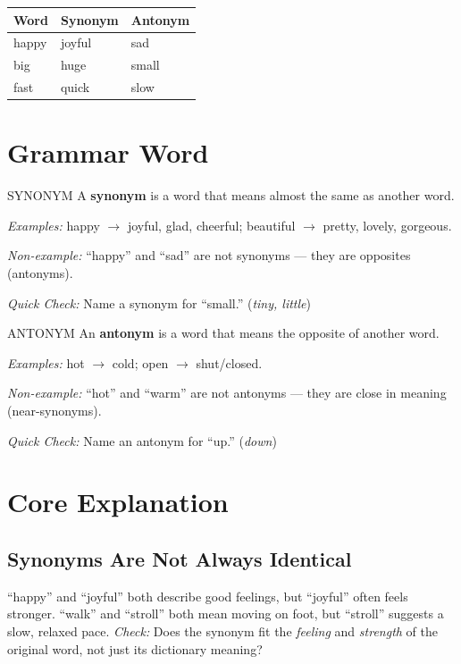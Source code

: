 \begin{table}[h!]
\centering
\begin{tabular}{|l|l|l|}
\hline
\textbf{Word} & \textbf{Synonym} & \textbf{Antonym} \\
\hline
happy & joyful & sad \\
big & huge & small \\
fast & quick & slow \\
\hline
\end{tabular}
\end{table}

\section{Grammar Word}
\begin{grammarword}{SYNONYM}
A \textbf{synonym} is a word that means almost the same as another word.

\textit{Examples:} happy $\rightarrow$ joyful, glad, cheerful; beautiful $\rightarrow$ pretty, lovely, gorgeous.

\textit{Non-example:} ``happy'' and ``sad'' are not synonyms --- they are opposites (antonyms).

\textit{Quick Check:} Name a synonym for ``small.'' (\textit{tiny, little})
\end{grammarword}

\begin{grammarword}{ANTONYM}
An \textbf{antonym} is a word that means the opposite of another word.

\textit{Examples:} hot $\rightarrow$ cold; open $\rightarrow$ shut/closed.

\textit{Non-example:} ``hot'' and ``warm'' are not antonyms --- they are close in meaning (near-synonyms).

\textit{Quick Check:} Name an antonym for ``up.'' (\textit{down})
\end{grammarword}

\section{Core Explanation}

\subsection*{Synonyms Are Not Always Identical}
``happy'' and ``joyful'' both describe good feelings, but ``joyful'' often feels stronger. ``walk'' and ``stroll'' both mean moving on foot, but ``stroll'' suggests a slow, relaxed pace. \textit{Check:} Does the synonym fit the \textit{feeling} and \textit{strength} of the original word, not just its dictionary meaning?

